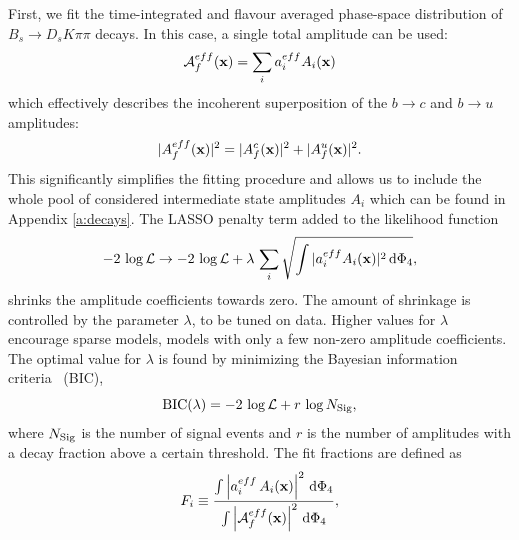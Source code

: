 First, we fit the time-integrated and flavour averaged phase-space distribution of $B_s \to D_s K \pi \pi$  decays.
In this case, a single total amplitude can be used:
\begin{equation}
\mathcal A_f^{eff}(\mathbf{x}) = \sum_i a^{eff}_i  A_i(\mathbf{x})
\end{equation}
which effectively describes the incoherent superposition of the $b\to c$ and $b\to u$ amplitudes:
\begin{equation}
	\mathcal  \vert A_f^{eff}(\mathbf{x})  \vert^{2} = \mathcal  \vert A_f^c(\mathbf{x})  \vert^{2} +  \mathcal  \vert A_f^u(\mathbf{x})   \vert^{2}   .
\end{equation}
This significantly simplifies the fitting procedure and allows us 
to include the whole pool of considered intermediate state amplitudes $A_i$ which can be found in Appendix \ref{a:decays}.
The LASSO penalty term added to the likelihood function
\begin{equation}
	-2 \, \log \mathcal L \rightarrow -2 \, \log \mathcal L + \lambda \, \sum_{i} \sqrt{ \int \vert a^{eff}_i  A_i(\mathbf{x}) \vert^{2} \, \text{d}\Phi_{4}  },
\end{equation}
shrinks the amplitude coefficients towards zero.
The amount of shrinkage is controlled by the parameter $\lambda$, to be tuned on data.
Higher values for $\lambda$ encourage sparse models, \ie models with only a few non-zero amplitude coefficients.
The optimal value for $\lambda$ is found by minimizing the Bayesian information criteria~\cite{BIC} (BIC),
\begin{equation}
	\text{BIC}(\lambda) = - 2 \, \log \mathcal L + r  \, \log N_{\rm Sig},
\end{equation}
where $N_{\rm Sig}$ is the number of signal events and $r$ is the number of amplitudes with a decay fraction above 
a certain threshold.
The fit fractions are defined as
\begin{equation}
\label{eq:DefineFitFractions}
	F_{i} \equiv \frac{\int \left\vert   a^{eff}_{i} \, A_{i}(\mathbf{x}) \right\vert^{2} \, \text{d}\Phi_{4} }
	{\int \left\vert  \mathcal A_f^{eff}(\mathbf{x}) \right\vert^{2} \, \text{d}\Phi_{4}}, 
\end{equation}
